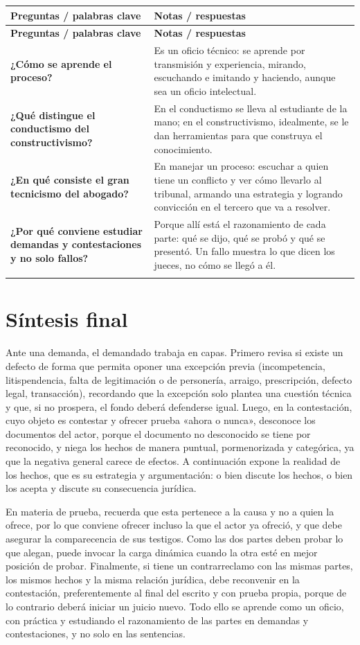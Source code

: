 \documentclass[12pt,oneside]{book}
\newenvironment{cornell}{%
  \begin{longtable}{>{\raggedright\arraybackslash}p{0.26\textwidth}>{\raggedright\arraybackslash}p{0.64\textwidth}}
  \toprule
  \textbf{Preguntas / palabras clave} & \textbf{Notas / respuestas} \\
  \midrule
  \endfirsthead
  \toprule
  \textbf{Preguntas / palabras clave} & \textbf{Notas / respuestas} \\
  \midrule
  \endhead
}{%
  \bottomrule
  \end{longtable}
}
\newcommand{\cornellresumen}[1]{%
  \midrule
  \multicolumn{2}{p{\dimexpr0.90\textwidth+2\tabcolsep\relax}}{\textbf{Resumen:} #1} \\
}
\begin{document}
\begin{cornell}
\textbf{¿Cómo se aprende el proceso?} &
Es un oficio técnico: se aprende por transmisión y experiencia, mirando, escuchando e imitando y haciendo, aunque sea un oficio intelectual. \\
\addlinespace
\textbf{¿Qué distingue el conductismo del constructivismo?} &
En el conductismo se lleva al estudiante de la mano; en el constructivismo, idealmente, se le dan herramientas para que construya el conocimiento. \\
\addlinespace
\textbf{¿En qué consiste el gran tecnicismo del abogado?} &
En manejar un proceso: escuchar a quien tiene un conflicto y ver cómo llevarlo al tribunal, armando una estrategia y logrando convicción en el tercero que va a resolver. \\
\addlinespace
\textbf{¿Por qué conviene estudiar demandas y contestaciones y no solo fallos?} &
Porque allí está el razonamiento de cada parte: qué se dijo, qué se probó y qué se presentó. Un fallo muestra lo que dicen los jueces, no cómo se llegó a él. \\
\cornellresumen{El proceso es un oficio técnico e intelectual que se aprende por transmisión y experiencia. Conviene estudiar el razonamiento de las partes en demandas y contestaciones, y no solo las sentencias.}
\end{cornell}

\section{Síntesis final}

Ante una demanda, el demandado trabaja en capas. Primero revisa si existe un defecto de forma que permita oponer una excepción previa (incompetencia, litispendencia, falta de legitimación o de personería, arraigo, prescripción, defecto legal, transacción), recordando que la excepción solo plantea una cuestión técnica y que, si no prospera, el fondo deberá defenderse igual. Luego, en la contestación, cuyo objeto es contestar y ofrecer prueba «ahora o nunca», desconoce los documentos del actor, porque el documento no desconocido se tiene por reconocido, y niega los hechos de manera puntual, pormenorizada y categórica, ya que la negativa general carece de efectos. A continuación expone la realidad de los hechos, que es su estrategia y argumentación: o bien discute los hechos, o bien los acepta y discute su consecuencia jurídica.

En materia de prueba, recuerda que esta pertenece a la causa y no a quien la ofrece, por lo que conviene ofrecer incluso la que el actor ya ofreció, y que debe asegurar la comparecencia de sus testigos. Como las dos partes deben probar lo que alegan, puede invocar la carga dinámica cuando la otra esté en mejor posición de probar. Finalmente, si tiene un contrarreclamo con las mismas partes, los mismos hechos y la misma relación jurídica, debe reconvenir en la contestación, preferentemente al final del escrito y con prueba propia, porque de lo contrario deberá iniciar un juicio nuevo. Todo ello se aprende como un oficio, con práctica y estudiando el razonamiento de las partes en demandas y contestaciones, y no solo en las sentencias.
\end{document}
